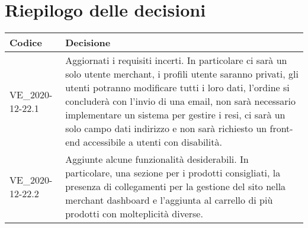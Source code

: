 \section{Riepilogo delle decisioni}
\setcounter{table}{-1}
{
\centering
\renewcommand{\arraystretch}{1.5}
\begin{longtable}{>{\centering}p{} >{}p{}}
\rowcolor{azzurro1}
\textbf{Codice} &
\centerline{\textbf{Decisione}}\\
\endhead

VE{\_}2020-12-22.1 & Aggiornati i requisiti incerti. In particolare ci sarà un solo utente merchant, i profili utente saranno privati, gli utenti potranno modificare tutti i loro dati, l'ordine si concluderà con l'invio di una email, non sarà necessario implementare un sistema per gestire i resi, ci sarà un solo campo dati indirizzo e non sarà richiesto un front-end accessibile a utenti con disabilità. \\
VE{\_}2020-12-22.2 & Aggiunte alcune funzionalità desiderabili. In particolare, una sezione per i prodotti consigliati, la presenza di collegamenti per la gestione del sito nella merchant dashboard e l'aggiunta al carrello di più prodotti con molteplicità diverse.\\
\end{longtable}
}